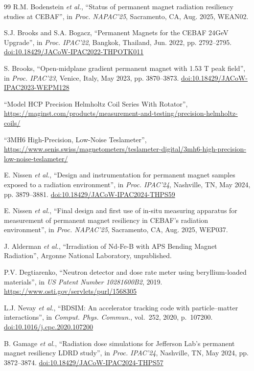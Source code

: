\documentclass[a4paper,
               ]{jacow}
\begin{document}
{\begin{thebibliography}{99}
            R.M. Bodenstein \emph{et al.},
            ``Status of permanent magnet radiation resiliency studies at CEBAF'',
            in \emph{Proc. NAPAC'25}, Sacramento, CA, Aug. 2025, WEAN02.

           S.J. Brooks and S.A. Bogacz,
           ``Permanent Magnets for the CEBAF 24GeV Upgrade'',
           in \emph{Proc. IPAC'22}, Bangkok, Thailand, Jun. 2022, pp. 2792--2795.
           \url{doi:10.18429/JACoW-IPAC2022-THPOTK011}

            S. Brooks,
            ``Open-midplane gradient permanent magnet with 1.53 T peak field'',
            in \emph{Proc. IPAC'23}, Venice, Italy, May 2023, pp. 3870--3873.
            \url{doi:10.18429/JACoW-IPAC2023-WEPM128}

            ``Model HCP Precision Helmholtz Coil Series With Rotator'', \url{https://maginst.com/products/measurement-and-testing/precision-helmholtz-coils/}

            ``3MH6 High-Precision, Low-Noise Teslameter'', \url{https://www.senis.swiss/magnetometers/teslameter-digital/3mh6-high-precision-low-noise-teslameter/}

            E. Nissen \emph{et al.},
            ``Design and instrumentation for permanent magnet samples exposed to a radiation environment'',
            in \emph{Proc. IPAC'24}, Nashville, TN, May 2024, pp. 3879--3881.
            \url{doi:10.18429/JACoW-IPAC2024-THPS59}

            E. Nissen \emph{et al.},
            ``Final design and first use of in-situ measuring apparatus for measurement of permanent magnet resiliency in CEBAF's radiation environment'',
            in \emph{Proc. NAPAC'25}, Sacramento, CA, Aug. 2025, WEP037.

            J. Alderman \emph{et al.},
            ``Irradiation of Nd-Fe-B with APS Bending Magnet Radiation'',
            Argonne National Laboratory, unpublished.

           P.V. Degtiarenko,
           ``Neutron detector and dose rate meter using beryllium-loaded materials'',
           in \emph{US Patent Number 10281600B2}, 2019.
           \url{https://www.osti.gov/servlets/purl/1568305}

            L.J. Nevay \emph{et al.},
            ``BDSIM: An accelerator tracking code with particle--matter interactions'',
            in \emph{Comput. Phys. Commun.}, vol.~252, 2020, p.~107200.
            \url{doi:10.1016/j.cpc.2020.107200}

              B. Gamage \emph{et al.},
            ``Radiation dose simulations for Jefferson Lab's permanent magnet resiliency LDRD study'',
            in \emph{Proc. IPAC'24}, Nashville, TN, May 2024, pp. 3872--3874.
            \url{doi:10.18429/JACoW-IPAC2024-THPS57}

    \end{thebibliography}
} %
\end{document}
